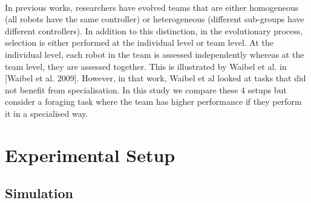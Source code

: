 \documentclass[sigconf]{aamas}  %
\begin{document}
\paragraph{}
In previous works, researchers have evolved teams that are either homogeneous (all robots have the same controller) or heterogeneous (different sub-groups have different controllers). In addition to this distinction, in the evolutionary process, selection is either performed at the individual level or team level. At the individual level, each robot in the team is assessed independently whereas at the team level, they are assessed together. This is illustrated by Waibel et al. in [Waibel et al. 2009]. However, in that work, Waibel et al looked at tasks that did not benefit from specialisation. In this study we compare these 4 setups but consider a foraging task where the team has higher performance if they perform it in a specialised way.


\section{Experimental Setup \label{setup}}

\subsection{Simulation}
\end{document}

